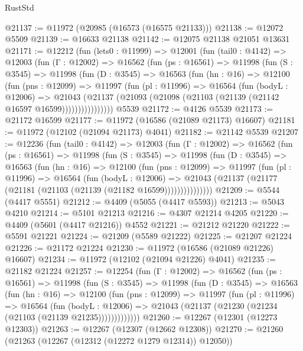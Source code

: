 \begin{lexlean}{RustStd}
\begin{coremodule}
@21137 := @11972 (@20985 (@16573 (@16575 @21133)))
@21138 := @12072 @5509
@21139 := @16633 @21138
@21142 := @12075 @21138 @21051 @13631
@21171 := @12212
    (fun (lets0 : @11999) =>
    @12001
      (fun (tail0 : @4142) =>
      @12003
        (fun (Γ : @12002) =>
        @16562
          (fun (ps : @16561) =>
          @11998
            (fun (S : @3545) =>
            @11998
              (fun (D : @3545) =>
              @16563
                (fun (hn : @16) =>
                @12100
                  (fun (pns : @12099) =>
                  @11997
                    (fun (pl : @11996) =>
                    @16564
                      (fun (bodyL : @12006) =>
                      @21043
                        (@21137
                          (@21093 (@21098 (@21103 (@21139 (@21142 @16597 @16599))))))))))))))))
    @5539
@21172 := @4126 @5539
@21173 := @21172 @16599
@21177 := @11972 (@16586 (@21089 @21173) @16607)
@21181 := @11972 (@12102 (@21094 @21173) @4041)
@21182 := @21142 @5539
@21207 := @12236
    (fun (tail0 : @4142) =>
    @12003
      (fun (Γ : @12002) =>
      @16562
        (fun (ps : @16561) =>
        @11998
          (fun (S : @3545) =>
          @11998
            (fun (D : @3545) =>
            @16563
              (fun (hn : @16) =>
              @12100
                (fun (pns : @12099) =>
                @11997
                  (fun (pl : @11996) =>
                  @16564
                    (fun (bodyL : @12006) =>
                    @21043 (@21137 (@21177 (@21181 (@21103 (@21139 (@21182 @16599)))))))))))))))
@21209 := @5544 (@4417 @5551)
@21212 := @4409 (@5055 (@4417 @5593))
@21213 := @5043 @4210
@21214 := @5101 @21213
@21216 := @4307 @21214 @4205
@21220 := @4409 (@5601 (@4417 @21216)) @4552
@21221 := @21212 @21220
@21222 := @5591 @21221
@21224 := @21209 (@5589 @21222)
@21225 := @21207 @21224
@21226 := @21172 @21224
@21230 := @11972 (@16586 (@21089 @21226) @16607)
@21234 := @11972 (@12102 (@21094 @21226) @4041)
@21235 := @21182 @21224
@21257 := @12254
    (fun (Γ : @12002) =>
    @16562
      (fun (ps : @16561) =>
      @11998
        (fun (S : @3545) =>
        @11998
          (fun (D : @3545) =>
          @16563
            (fun (hn : @16) =>
            @12100
              (fun (pns : @12099) =>
              @11997
                (fun (pl : @11996) =>
                @16564
                  (fun (bodyL : @12006) =>
                  @21043 (@21137 (@21230 (@21234 (@21103 (@21139 @21235)))))))))))))
@21260 := @12267 (@12301 (@12273 @12303))
@21263 := @12267 (@12307 (@12662 @12308))
@21270 := @21260 (@21263 (@12267 (@12312 (@12272 @1279 @12314)) @12050))

\end{coremodule}
\end{lexlean}
